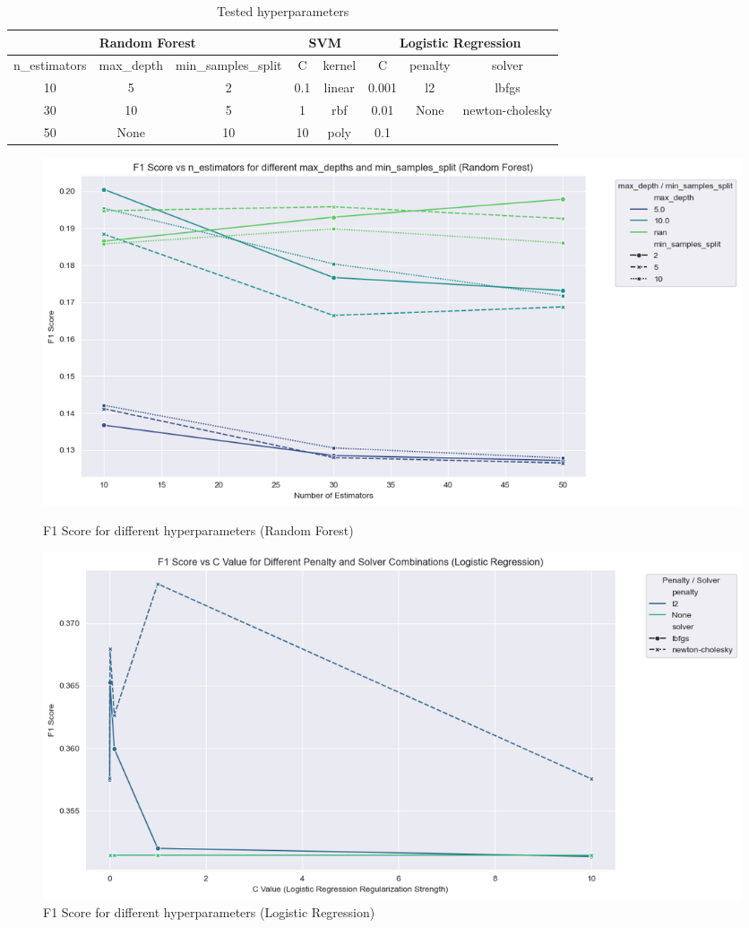 \begin{enumerate}[label=\roman*.)]
\begin{table}[htbp]
    \centering
    \begin{tabular}{ccc|cc|ccc}\toprule
         \multicolumn{3}{c}{\textbf{Random Forest}} & \multicolumn{2}{|c|}{\textbf{SVM}}& \multicolumn{3}{c}{\textbf{Logistic Regression}} \\ \midrule
         n\_estimators&  max\_depth& min\_samples\_split & C& kernel
& C& penalty&solver
\\
         10&  5& 2 & 0.1& linear
& 0.001& l2&lbfgs
\\
         30&  10& 5 & 1& rbf
& 0.01& None&newton-cholesky
\\
         50&  None& 10 & 10& poly& 0.1& &
\\ \bottomrule
    \end{tabular}
    \caption{Tested hyperparameters}
    \label{tab:Tested hyperparameters}
\end{table}


\begin{figure}[htbp]
  \centering
  \begin{minipage}[b]{0.49\textwidth}
    \centering
    \includegraphics[width=\textwidth]{figs/Random_Forest.png}
    \caption{F1 Score for different hyperparameters (Random Forest)}
    \label{fig:F1 Score for different hyperparameters - Random Forest}
  \end{minipage}
  \hfill
  \begin{minipage}[b]{0.49\textwidth}
    \centering
    \includegraphics[width=\textwidth]{figs/Logistic_Regression.png}
    \caption{F1 Score for different hyperparameters (Logistic Regression)}
    \label{fig:F1 Score for different hyperparameters - Logistic Regression}
  \end{minipage}
\end{figure}


\end{enumerate}
